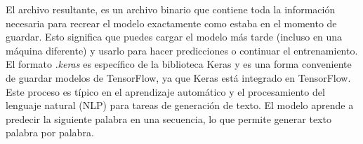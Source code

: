 El archivo resultante, es un archivo binario que contiene toda la información necesaria para 
recrear el modelo exactamente como estaba en el momento de guardar. Esto significa que 
puedes cargar el modelo más tarde (incluso en una máquina diferente) y usarlo para hacer 
predicciones o continuar el entrenamiento. El formato .\textit{keras} es específico de la 
biblioteca Keras y es una forma conveniente de guardar modelos de TensorFlow, ya que Keras 
está integrado en TensorFlow.\\ 


Este proceso es típico en el aprendizaje automático y el procesamiento del lenguaje natural 
(NLP) para tareas de generación de texto. El modelo aprende a predecir la siguiente palabra en 
una secuencia, lo que permite generar texto palabra por palabra.\\